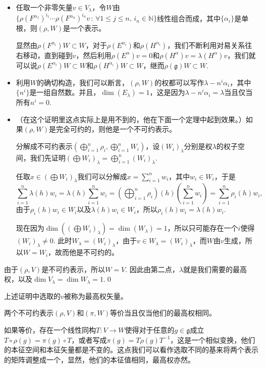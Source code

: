 \documentclass[9pt]{extarticle}
\newcommand{\lag}{{\mathfrak{g}}}
\begin{document}
\begin{itemize}
\item 任取一个非零矢量$v\in V_\lambda$，令$W$由$\bigl\{\rho(F^{\alpha_1})^{i_1}\cdots \rho(F^{\alpha_n})^{i_n}v\,:\, \forall 1\leq j\leq n,\, i_n\in \mathbb{N}\bigr\}$线性组合而成，其中$\{\alpha_i\}$是单根，则$(\rho,W)$是一个表示。

显然由$\rho(F^{\alpha_i})W\subset W$，对于$\rho(E^{\alpha_i})$和$\rho(H^{\alpha_i})$，我们不断利用对易关系往右移动，直到碰到$v$，然后利用$\rho(E^\alpha)v=0$和$\rho(H^\alpha)v=\lambda(H^\alpha)v$，我们就可以说$\rho(E^{\alpha_i})W\subset W$和$\rho(H^{\alpha_i})W\subset W$，继而$\rho(\lag)W\subset W$.

\item 利用$W$的确切构造，我们可以断言，$(\rho,W)$的权都可以写作$\lambda-n^i\alpha_i$，其中$\{n^i\}$是一组自然数。并且，$\dim(E_\lambda)=1$，这是因为$\lambda-n^i\alpha_i=\lambda$当且仅当所有$n^i=0$.

\item （在这个证明里这点实际上是用不到的，他在下面一个定理中起到效果。）如果$(\rho,W)$是完全可约的，则他是一个不可约表示。

分解成不可约表示$(\bigoplus_{i=1}^n\rho_i,\bigoplus_{i=1}^n W_i)$，设$(W_i)_\lambda$分别是权$\lambda$的权子空间，我们先证明$(\bigoplus W_i)_\lambda=\bigoplus_{i=1}^n (W_i)_\lambda$.

任取$x\in (\bigoplus W_i)_\lambda$我们可以分解成$x=\sum_{i=1}^nw_i$，其中$w_i\in W_i$，于是
\[
	\sum_{i=1}^n\lambda(h)w_i=\lambda(h)\sum_{i=1}^nw_i=\left(\bigoplus_{i=1}^n\rho_i\right)(h)\left(\sum_{i=1}^nw_i\right)=\sum_{i=1}^n\rho_i(h)w_i,
\]
由于$\rho_i(h)w_i\in W_i$以及$\lambda(h)w_i\in W_i$，所以$\rho_i(h)w_i=\lambda(h)w_i$. 

现在因为$\dim((\bigoplus W_i)_\lambda)=\dim(W_\lambda)=1$，所以只可能存在一个$i$使得$(W_i)_\lambda\neq 0$. 此时$W_\lambda=(W_i)_\lambda$，由于$v\in W_\lambda=(W_i)_\lambda$，而$W$由$v$生成，所以$W=W_i$，故而他是不可约的。
\end{itemize}

由于$(\rho,V)$是不可约表示，所以$W=V$. 因此由第二点，$\lambda$就是我们需要的最高权，以及$\dim V_\lambda=\dim W_\lambda=1$.\qed 

上述证明中选取的$v$被称为最高权矢量。

\theo 两个不可约表示$(\rho,V)$和$(\pi,W)$等价当且仅当他们的最高权相同。

\proof 如果等价，存在一个线性同构$T:V\to W$使得对于任意的$g\in\lag$成立$T\circ \rho(g)=\pi(g)\circ T$，或者写成$\pi(g)=T\rho(g)T^{-1}$，这是一个相似变换，他们的本征空间和本征矢量都是不变的。这点我们可以看作选取不同的基来将两个表示的矩阵调整成一个，显然，他们的本征值相同，最高权亦然。
\end{document}
